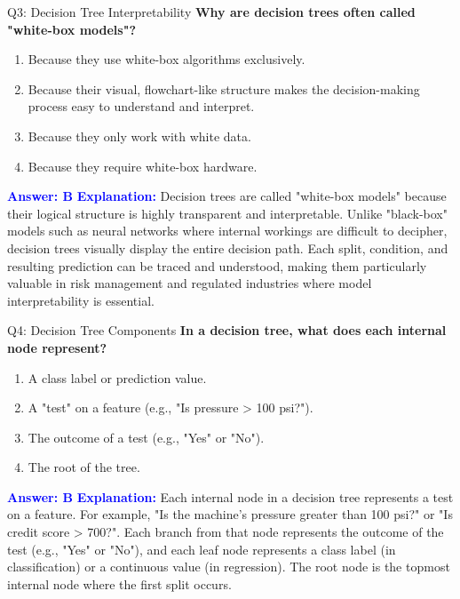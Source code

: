 \documentclass[8pt]{beamer}
\begin{document}
	\begin{frame}{Q3: Decision Tree Interpretability}
		\fontsize{6.5}{7.5}\selectfont
		\textbf{Why are decision trees often called "white-box models"?}
		\begin{enumerate}
			\item Because they use white-box algorithms exclusively.
			\item Because their visual, flowchart-like structure makes the decision-making process easy to understand and interpret.
			\item Because they only work with white data.
			\item Because they require white-box hardware.
		\end{enumerate}
		\vspace{0.1cm}
		\textcolor{blue}{\textbf{Answer: B}}
		\vspace{0.1cm}
		\textcolor{blue}{\textbf{Explanation:}} Decision trees are called "white-box models" because their logical structure is highly transparent and interpretable. Unlike "black-box" models such as neural networks where internal workings are difficult to decipher, decision trees visually display the entire decision path. Each split, condition, and resulting prediction can be traced and understood, making them particularly valuable in risk management and regulated industries where model interpretability is essential.
	\end{frame}
	
	\begin{frame}{Q4: Decision Tree Components}
		\fontsize{6.5}{7.5}\selectfont
		\textbf{In a decision tree, what does each internal node represent?}
		\begin{enumerate}
			\item A class label or prediction value.
			\item A "test" on a feature (e.g., "Is pressure > 100 psi?").
			\item The outcome of a test (e.g., "Yes" or "No").
			\item The root of the tree.
		\end{enumerate}
		\vspace{0.1cm}
		\textcolor{blue}{\textbf{Answer: B}}
		\vspace{0.1cm}
		\textcolor{blue}{\textbf{Explanation:}} Each internal node in a decision tree represents a test on a feature. For example, "Is the machine's pressure greater than 100 psi?" or "Is credit score > 700?". Each branch from that node represents the outcome of the test (e.g., "Yes" or "No"), and each leaf node represents a class label (in classification) or a continuous value (in regression). The root node is the topmost internal node where the first split occurs.
	\end{frame}
	
\end{document}
